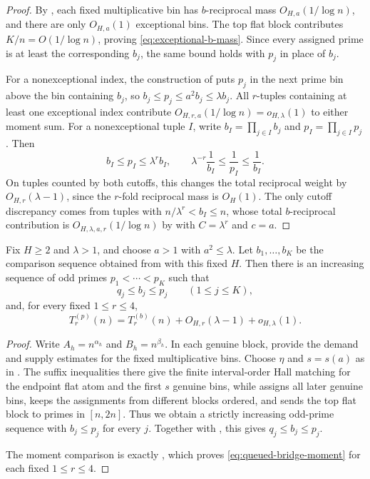 \begin{proof}
By , each fixed multiplicative bin has
$b$-reciprocal mass $O_{H,a}(1/\log n)$, and there are only $O_{H,a}(1)$
exceptional bins.  The top flat block contributes $K/n=O(1/\log n)$, proving
\eqref{eq:exceptional-b-mass}.  Since every assigned prime is at least the
corresponding $b_j$, the same bound holds with $p_j$ in place of $b_j$.

For a nonexceptional index, the construction of
 puts $p_j$ in the next prime bin above
the bin containing $b_j$, so $b_j\le p_j\le a^2b_j\le\lambda b_j$.
All $r$-tuples containing at least one exceptional index contribute
$O_{H,r,a}(1/\log n)=o_{H,\lambda}(1)$ to either moment sum.  For a
nonexceptional tuple $I$, write $b_I=\prod_{j\in I}b_j$ and
$p_I=\prod_{j\in I}p_j$.  Then
\[
  b_I\le p_I\le\lambda^r b_I,\qquad
  \lambda^{-r}\frac1{b_I}\le\frac1{p_I}\le\frac1{b_I}.
\]
On tuples counted by both cutoffs, this changes the total reciprocal weight by
$O_{H,r}(\lambda-1)$, since the $r$-fold reciprocal mass is $O_H(1)$.  The only
cutoff discrepancy comes from tuples with $n/\lambda^r<b_I\le n$, whose total
$b$-reciprocal contribution is $O_{H,\lambda,a,r}(1/\log n)$ by
 with $C=\lambda^r$ and $c=a$.
\end{proof}

\begin{proposition}
\label{prop:queued-prime-rounding}
Fix $H\ge2$ and $\lambda>1$, and choose $a>1$ with $a^2\le\lambda$.
Let $b_1,\ldots,b_K$ be the comparison sequence obtained from
 with this fixed $H$.  Then there is an
increasing sequence of odd primes $p_1<\cdots<p_K$ such that
\[
  q_j\le b_j\le p_j\qquad (1\le j\le K),
\]
and, for every fixed $1\le r\le4$,
\[
  T_r^{(p)}(n)=T_r^{(b)}(n)+O_{H,r}(\lambda-1)+o_{H,\lambda}(1).
  \tag{7.1}\label{eq:queued-bridge-moment}
\]
\end{proposition}


\begin{proof}
Write $A_h=n^{\alpha_h}$ and $B_h=n^{\beta_h}$.  In each genuine block,
 provide the demand
and supply estimates for the fixed multiplicative bins.  Choose $\eta$ and
$s=s(a)$ as in .  The suffix inequalities
there give the finite interval-order Hall matching for the endpoint flat atom
and the first $s$ genuine bins, while 
assigns all later genuine bins, keeps the assignments from different blocks
ordered, and sends the top flat block to primes in $[n,2n]$.  Thus we obtain a
strictly increasing odd-prime sequence with $b_j\le p_j$ for every $j$.
Together with , this gives $q_j\le b_j\le p_j$.

The moment comparison is exactly
, which proves
\eqref{eq:queued-bridge-moment} for each fixed $1\le r\le4$.
\end{proof}

